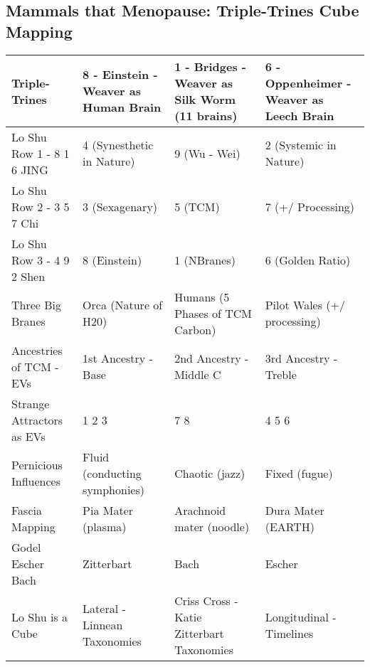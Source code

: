 \documentclass{article}
\begin{document}
\begin{landscape}

\section*{Mammals that Menopause: Triple-Trines Cube Mapping}

\renewcommand{\arraystretch}{1.5}

\begin{longtable}{|p{4.8cm}|p{5cm}|p{5cm}|p{5cm}|}
\hline
\textbf{Triple-Trines} 
& \textbf{8 - Einstein - Weaver as Human Brain} 
& \textbf{1 - Bridges - Weaver as Silk Worm (11 brains)} 
& \textbf{6 - Oppenheimer - Weaver as Leech Brain} \\
\hline
Lo Shu Row 1 - 8 1 6 JING 
& 4 (Synesthetic in Nature) 
& 9 (Wu - Wei) 
& 2 (Systemic in Nature) \\
Lo Shu Row 2 - 3 5 7 Chi 
& 3 (Sexagenary) 
& 5 (TCM) 
& 7 (+/ Processing) \\
Lo Shu Row 3 - 4 9 2 Shen 
& 8 (Einstein) 
& 1 (NBranes) 
& 6 (Golden Ratio) \\
Three Big Branes 
& Orca (Nature of H20) 
& Humans (5 Phases of TCM Carbon) 
& Pilot Wales (+/ processing) \\
Ancestries of TCM - EVs 
& 1st Ancestry - Base 
& 2nd Ancestry - Middle C 
& 3rd Ancestry - Treble \\
Strange Attractors as EVs 
& 1 2 3 
& 7 8  
& 4 5 6 \\
Pernicious Influences 
& Fluid (conducting symphonies) 
& Chaotic (jazz) 
& Fixed (fugue) \\
Fascia Mapping 
& Pia Mater (plasma) 
& Arachnoid mater (noodle) 
& Dura Mater (EARTH) \\
Godel Escher Bach 
& Zitterbart 
& Bach 
& Escher \\
Lo Shu is a Cube 
& Lateral - Linnean Taxonomies 
& Criss Cross - Katie Zitterbart Taxonomies 
& Longitudinal - Timelines \\
\hline
\end{longtable}

\end{landscape}
\end{document}
